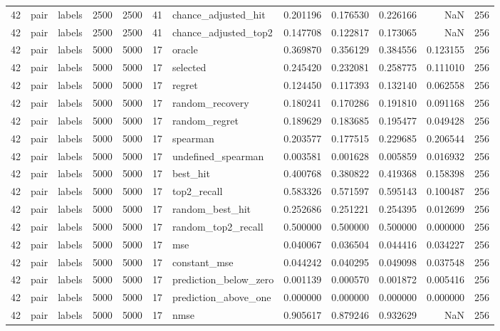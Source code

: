 \begin{tabular}{rllrrrlrrrrr}
42 & pair & labels & 2500 & 2500 & 41 & chance_adjusted_hit & 0.201196 & 0.176530 & 0.226166 & NaN & 256 \\
42 & pair & labels & 2500 & 2500 & 41 & chance_adjusted_top2 & 0.147708 & 0.122817 & 0.173065 & NaN & 256 \\
42 & pair & labels & 5000 & 5000 & 17 & oracle & 0.369870 & 0.356129 & 0.384556 & 0.123155 & 256 \\
42 & pair & labels & 5000 & 5000 & 17 & selected & 0.245420 & 0.232081 & 0.258775 & 0.111010 & 256 \\
42 & pair & labels & 5000 & 5000 & 17 & regret & 0.124450 & 0.117393 & 0.132140 & 0.062558 & 256 \\
42 & pair & labels & 5000 & 5000 & 17 & random_recovery & 0.180241 & 0.170286 & 0.191810 & 0.091168 & 256 \\
42 & pair & labels & 5000 & 5000 & 17 & random_regret & 0.189629 & 0.183685 & 0.195477 & 0.049428 & 256 \\
42 & pair & labels & 5000 & 5000 & 17 & spearman & 0.203577 & 0.177515 & 0.229685 & 0.206544 & 256 \\
42 & pair & labels & 5000 & 5000 & 17 & undefined_spearman & 0.003581 & 0.001628 & 0.005859 & 0.016932 & 256 \\
42 & pair & labels & 5000 & 5000 & 17 & best_hit & 0.400768 & 0.380822 & 0.419368 & 0.158398 & 256 \\
42 & pair & labels & 5000 & 5000 & 17 & top2_recall & 0.583326 & 0.571597 & 0.595143 & 0.100487 & 256 \\
42 & pair & labels & 5000 & 5000 & 17 & random_best_hit & 0.252686 & 0.251221 & 0.254395 & 0.012699 & 256 \\
42 & pair & labels & 5000 & 5000 & 17 & random_top2_recall & 0.500000 & 0.500000 & 0.500000 & 0.000000 & 256 \\
42 & pair & labels & 5000 & 5000 & 17 & mse & 0.040067 & 0.036504 & 0.044416 & 0.034227 & 256 \\
42 & pair & labels & 5000 & 5000 & 17 & constant_mse & 0.044242 & 0.040295 & 0.049098 & 0.037548 & 256 \\
42 & pair & labels & 5000 & 5000 & 17 & prediction_below_zero & 0.001139 & 0.000570 & 0.001872 & 0.005416 & 256 \\
42 & pair & labels & 5000 & 5000 & 17 & prediction_above_one & 0.000000 & 0.000000 & 0.000000 & 0.000000 & 256 \\
42 & pair & labels & 5000 & 5000 & 17 & nmse & 0.905617 & 0.879246 & 0.932629 & NaN & 256 \\

\end{tabular}
